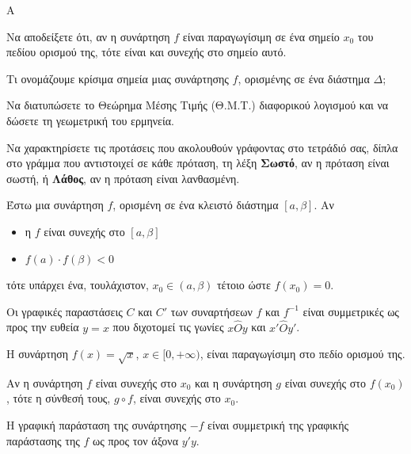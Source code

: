 \begin{thema}{Α}
\begin{erwthma}
    \item Να αποδείξετε ότι, αν η συνάρτηση $f$ είναι παραγωγίσιμη σε ένα σημείο $x_0$ του πεδίου ορισμού της, τότε είναι και συνεχής στο σημείο αυτό. 

    \item Τι ονομάζουμε κρίσιμα σημεία μιας συνάρτησης $f$, ορισμένης σε ένα διάστημα $\Delta$; 

    \item Να διατυπώσετε το Θεώρημα Μέσης Τιμής (Θ.Μ.Τ.) διαφορικού λογισμού και να δώσετε τη γεωμετρική του ερμηνεία. 

    \item Να χαρακτηρίσετε τις προτάσεις που ακολουθούν γράφοντας στο τετράδιό σας, δίπλα στο γράμμα που αντιστοιχεί σε κάθε πρόταση, τη λέξη \textbf{Σωστό}, αν η πρόταση είναι σωστή, ή \textbf{Λάθος}, αν η πρόταση είναι λανθασμένη.
    \begin{alist}
        \item Έστω μια συνάρτηση $f$, ορισμένη σε ένα κλειστό διάστημα $[a, \beta]$. Αν
        \begin{itemize}
            \item η $f$ είναι συνεχής στο $[a, \beta]$
            \item $f(a) \cdot f(\beta) < 0$
        \end{itemize}
        τότε υπάρχει ένα, τουλάχιστον, $x_0 \in (a, \beta)$ τέτοιο ώστε $f(x_0) = 0$.

        \item Οι γραφικές παραστάσεις $C$ και $C'$ των συναρτήσεων $f$ και $f^{-1}$ είναι συμμετρικές ως προς την ευθεία $y = x$ που διχοτομεί τις γωνίες $x\hat{O}y$ και $x'\hat{O}y'$.

        \item Η συνάρτηση $f(x) = \sqrt{x}$, $x \in [0, +\infty)$, είναι παραγωγίσιμη στο πεδίο ορισμού της.

        \item Αν η συνάρτηση $f$ είναι συνεχής στο $x_0$ και η συνάρτηση $g$ είναι συνεχής στο $f(x_0)$, τότε η σύνθεσή τους, $g \circ f$, είναι συνεχής στο $x_0$.

        \item Η γραφική παράσταση της συνάρτησης $-f$ είναι συμμετρική της γραφικής παράστασης της $f$ ως προς τον άξονα $y'y$.
    \end{alist}
\end{erwthma}
\end{thema}

